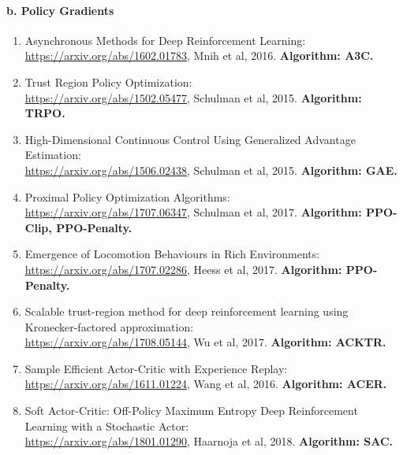 \documentclass[lang=cn,11pt,a4paper]{elegant_template}
\begin{document}
\paragraph{b. Policy Gradients}
\begin{enumerate}
    \item Asynchronous Methods for Deep Reinforcement Learning:\\ \href{https://arxiv.org/abs/1602.01783}{https://arxiv.org/abs/1602.01783}, Mnih et al, 2016. \textbf{Algorithm: A3C.}
    \item Trust Region Policy Optimization:\\ \href{https://arxiv.org/abs/1502.05477}{https://arxiv.org/abs/1502.05477}, Schulman et al, 2015. \textbf{Algorithm: TRPO.}
    \item High-Dimensional Continuous Control Using Generalized Advantage Estimation:\\ \href{https://arxiv.org/abs/1506.02438}{https://arxiv.org/abs/1506.02438}, Schulman et al, 2015. \textbf{Algorithm: GAE.}
    \item Proximal Policy Optimization Algorithms:\\ \href{https://arxiv.org/abs/1707.06347}{https://arxiv.org/abs/1707.06347}, Schulman et al, 2017. \textbf{Algorithm: PPO-Clip, PPO-Penalty.}
    \item Emergence of Locomotion Behaviours in Rich Environments:\\ \href{https://arxiv.org/abs/1707.02286}{https://arxiv.org/abs/1707.02286}, Heess et al, 2017. \textbf{Algorithm: PPO-Penalty.}
    \item Scalable trust-region method for deep reinforcement learning using Kronecker-factored approximation:\\ \href{https://arxiv.org/abs/1708.05144}{https://arxiv.org/abs/1708.05144}, Wu et al, 2017. \textbf{Algorithm: ACKTR.}
    \item Sample Efficient Actor-Critic with Experience Replay:\\ \href{https://arxiv.org/abs/1611.01224}{https://arxiv.org/abs/1611.01224}, Wang et al, 2016. \textbf{Algorithm: ACER.}
    \item Soft Actor-Critic: Off-Policy Maximum Entropy Deep Reinforcement Learning with a Stochastic Actor:\\ \href{https://arxiv.org/abs/1801.01290}{https://arxiv.org/abs/1801.01290}, Haarnoja et al, 2018. \textbf{Algorithm: SAC.}
\end{enumerate}
\end{document}
